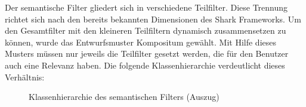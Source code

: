 Der semantische Filter gliedert sich in verschiedene Teilfilter. Diese Trennung richtet sich nach den bereits bekannten Dimensionen des Shark Frameworks. Um den Gesamtfilter mit den kleineren Teilfiltern dynamisch zusammensetzen zu können, wurde das Entwurfsmuster Kompositum gewählt. Mit Hilfe dieses Musters müssen nur jeweils die Teilfilter gesetzt werden, die für den Benutzer auch eine Relevanz haben. Die folgende Klassenhierarchie verdeutlicht dieses Verhältnis:
\begin{figure}[H]
	\centering
	\caption{Klassenhierarchie des semantischen Filters (Auszug)}
	\label{fig:filterStructure}
\end{figure} 
